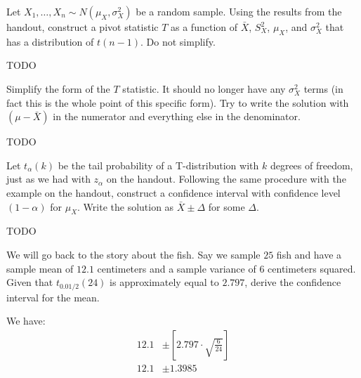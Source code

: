 
Let $X_1, \ldots, X_n \sim N(\mu_X, \sigma_X^2)$ be a random sample. Using
the results from the handout, construct a pivot statistic $T$ as a function
of $\bar{X}$, $S_X^2$, $\mu_X$, and $\sigma_X^2$ that has a distribution of
$t(n-1)$. Do not simplify.


TODO


Simplify the form of the $T$ statistic. It should no longer have any
$\sigma_X^2$ terms (in fact this is the whole point of this specific form). 
Try to write the solution with $(\mu - \bar{X})$ in the numerator and
everything else in the denominator.


TODO


Let $t_\alpha(k)$ be the tail probability of a T-distribution with $k$
degrees of freedom, just as we had with $z_\alpha$ on the handout. Following
the same procedure with the example on the handout, construct a confidence
interval with confidence level $(1 - \alpha)$ for $\mu_X$. Write the solution
as $\bar{X} \pm \Delta$ for some $\Delta$.


TODO



We will go back to the story about the fish. Say we sample $25$ fish and
have a sample mean of $12.1$ centimeters and a sample variance of $6$
centimeters squared. Given that $t_{0.01/2}(24)$ is approximately equal
to $2.797$, derive the confidence interval for the mean.


We have:
\begin{align*}
12.1 &\pm \left[ 2.797 \cdot \sqrt{\frac{6}{24}} \right] \\
12.1 &\pm 1.3985
\end{align*}


